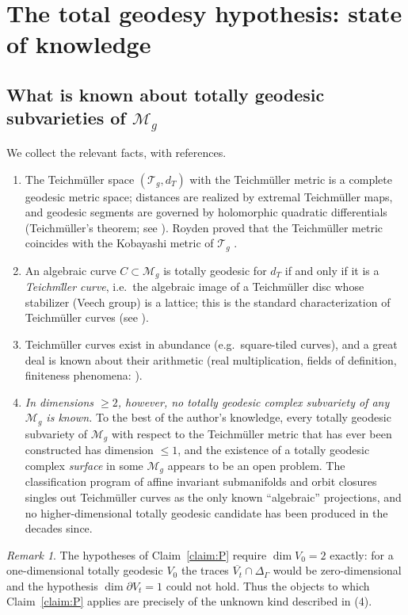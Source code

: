 \documentclass[11pt]{amsart}
\newcommand{\M}{\mathcal{M}}
\newcommand{\T}{\mathcal{T}}
\theoremstyle{plain}
\theoremstyle{definition}
\theoremstyle{remark}
\newtheorem{remark}[theorem]{Remark}
\begin{document}
\section{The total geodesy hypothesis: state of knowledge}\label{sec:knowledge}

\subsection{What is known about totally geodesic subvarieties of $\M_g$}

We collect the relevant facts, with references.

\begin{enumerate}
\item The Teichm\"uller space $(\T_g,d_T)$ with the Teichm\"uller metric is a complete
geodesic metric space; distances are realized by extremal Teichm\"uller maps, and
geodesic segments are governed by holomorphic quadratic differentials (Teichm\"uller's
theorem; see \cite{Hubbard06, IT}). Royden proved that the Teichm\"uller metric
coincides with the Kobayashi metric of $\T_g$ \cite{Royden}.
\item An algebraic curve $C\subset \M_g$ is totally geodesic for $d_T$ if and only if
it is a \emph{Teichm\"ller curve}, i.e.\ the algebraic image of a Teichm\"uller disc
whose stabilizer (Veech group) is a lattice; this is the standard characterization of
Teichm\"uller curves (see \cite{McMullen, Moeller, EMM}).
\item Teichm\"uller curves exist in abundance (e.g.\ square-tiled curves), and a great
deal is known about their arithmetic (real multiplication, fields of definition,
finiteness phenomena: \cite{Moeller, EMM, McMullen}).
\item \emph{In dimensions $\ge2$, however, no totally geodesic complex subvariety of
any $\M_g$ is known.} To the best of the author's knowledge, every totally geodesic
subvariety of $\M_g$ with respect to the Teichm\"uller metric that has ever been
constructed has dimension $\le 1$, and the existence of a totally geodesic complex
\emph{surface} in some $\M_g$ appears to be an open problem. The classification
program of affine invariant submanifolds and orbit closures
\cite{EMM, Moeller} singles out Teichm\"uller curves as the only known ``algebraic''
projections, and no higher-dimensional totally geodesic candidate has been produced
in the decades since.
\end{enumerate}

\begin{remark}
The hypotheses of Claim~\ref{claim:P} require $\dim V_0=2$ exactly: for a
one-dimensional totally geodesic $V_0$ the traces $\overline{V_t}\cap\Delta_\Gamma$
would be zero-dimensional and the hypothesis $\dim\partial V_t=1$ could not hold.
Thus the objects to which Claim~\ref{claim:P} applies are precisely of the unknown
kind described in (4).
\end{remark}
\end{document}
